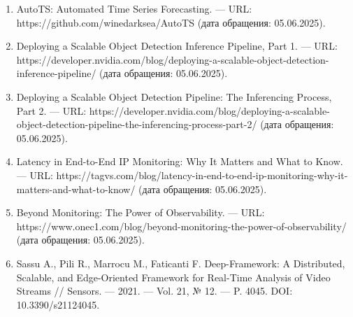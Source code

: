 \begin{enumerate}[label=\arabic*)\hspace{1em}, leftmargin=1cm, itemsep=0em]
	\item AutoTS: Automated Time Series Forecasting. — URL: https://github.com/winedarksea/AutoTS (дата обращения: 05.06.2025).
	\item Deploying a Scalable Object Detection Inference Pipeline, Part 1. — URL: https://developer.nvidia.com/blog/deploying-a-scalable-object-detection-inference-pipeline/ (дата обращения: 05.06.2025).
	\item Deploying a Scalable Object Detection Pipeline: The Inferencing Process, Part 2. — URL: https://developer.nvidia.com/blog/deploying-a-scalable-object-detection-pipeline-the-inferencing-process-part-2/ (дата обращения: 05.06.2025).
	\item Latency in End-to-End IP Monitoring: Why It Matters and What to Know. — URL: https://tagvs.com/blog/latency-in-end-to-end-ip-monitoring-why-it-matters-and-what-to-know/ (дата обращения: 05.06.2025).
	\item Beyond Monitoring: The Power of Observability. — URL: https://www.onec1.com/blog/beyond-monitoring-the-power-of-observability/ (дата обращения: 05.06.2025).
	\item Sassu A., Pili R., Marrocu M., Faticanti F. Deep-Framework: A Distributed, Scalable, and Edge-Oriented Framework for Real-Time Analysis of Video Streams // Sensors. — 2021. — Vol. 21, № 12. — P. 4045. DOI: 10.3390/s21124045.
\end{enumerate}